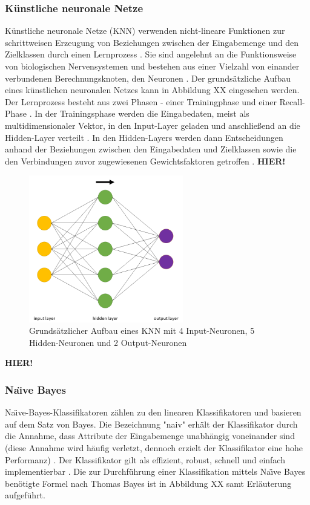 \subsubsection*{Künstliche neuronale Netze}
Künstliche neuronale Netze (KNN) verwenden nicht-lineare Funktionen zur schrittweisen Erzeugung von Beziehungen zwischen der Eingabemenge und den Zielklassen durch einen Lernprozess \cite{Linder2004}. Sie sind angelehnt an die Funktionsweise von biologischen Nervensystemen und bestehen aus einer Vielzahl von einander verbundenen Berechnungsknoten, den Neuronen \cite{OShea2015}. Der grundsätzliche Aufbau eines künstlichen neuronalen Netzes kann in Abbildung XX eingesehen werden. Der Lernprozess besteht aus zwei Phasen - einer Trainingphase und einer Recall-Phase \cite{Linder2004}. In der Trainingsphase werden die Eingabedaten, meist als multidimensionaler Vektor, in den Input-Layer geladen und anschließend an die Hidden-Layer verteilt \cite{OShea2015}. In den Hidden-Layers werden dann Entscheidungen anhand der Beziehungen zwischen den Eingabedaten und Zielklassen sowie die den Verbindungen zuvor zugewiesenen Gewichtsfaktoren getroffen \cite{Linder2004}. 
\textbf{HIER!}
\cite{Linder2004}

\begin{figure}[]
    \centering
    \includegraphics[width=0.6\textwidth]{images/ANN}
    \caption{Grundsätzlicher Aufbau eines KNN mit 4 Input-Neuronen, 5 Hidden-Neuronen und 2 Output-Neuronen\label{fig:ann}}
\end{figure}

\textbf{HIER!}

\subsubsection*{Na\"{\i}ve Bayes}
Na\"{\i}ve-Bayes-Klassifikatoren zählen zu den linearen Klassifikatoren und basieren auf dem Satz von Bayes. Die Bezeichnung "naiv" erhält der Klassifikator durch die Annahme, dass Attribute der Eingabemenge unabhängig voneinander sind (diese Annahme wird häufig verletzt, dennoch erzielt der Klassifikator eine hohe Performanz) \cite{Raschka2014}. Der Klassifikator gilt als effizient, robust, schnell und einfach implementierbar \cite{Raschka2014}. Die zur Durchführung einer Klassifikation mittels Na\"{\i}ve Bayes benötigte Formel nach Thomas Bayes ist in Abbildung XX samt Erläuterung aufgeführt.

